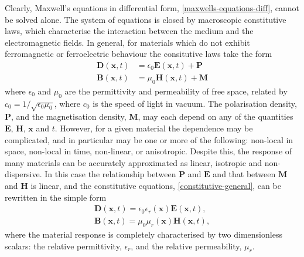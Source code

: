 Clearly, Maxwell's equations in differential form, \ref{maxwells-equations-diff}, cannot be solved alone. The system of equations is closed by macroscopic constitutive laws, which characterise the interaction between the medium and the electromagnetic fields. In general, for materials which do not exhibit ferromagnetic or ferroelectric behaviour the consitutive laws take the form
\begin{subequations}
    \label{constitutive-general}
    \begin{align}
        \mathbf{D}(\mathbf{x},t) &= \epsilon_0 \mathbf{E}(\mathbf{x},t) + \mathbf{P} \label{constitutive-general-E} \\
        \mathbf{B}(\mathbf{x},t) &= \mu_0 \mathbf{H}(\mathbf{x},t) + \mathbf{M}
    \end{align}
\end{subequations}
where $\epsilon_0$ and $\mu_0$ are the permittivity and permeability of free space, related by $c_0 = 1/ \sqrt{\epsilon_0 \mu_0}$, where $c_0$ is the speed of light in vacuum. The polarisation density, $\mathbf{P}$, and the magnetisation density, $\mathbf{M}$,
may each depend on any of the quantities $\mathbf{E}$, $\mathbf{H}$, $\mathbf{x}$ and $t$. However, for a given material the dependence may be complicated, and in particular may be one or more of the following: non-local in space, non-local in time, non-linear, or anisotropic. Despite this, the response of many materials can be accurately approximated as linear, isotropic and non-dispersive. In this case the relationship between $\mathbf{P}$ and $\mathbf{E}$ and that between $\mathbf{M}$ and $\mathbf{H}$ is linear, and the constitutive equations, \ref{constitutive-general}, can be rewritten in the simple form
%
\begin{subequations}
    \label{constitutive-linear}
    \begin{align}
        \mathbf{D}(\mathbf{x},t) = \epsilon_0 \epsilon_r(\mathbf{x}) \mathbf{E}(\mathbf{x},t), \label{constitutive-linear-D} \\
        \mathbf{B}(\mathbf{x},t) = \mu_0 \mu_r(\mathbf{x}) \mathbf{H}(\mathbf{x},t),
    \end{align}
\end{subequations}
%
where the material response is completely characterised by two dimensionless scalars: the relative permittivity, $\epsilon_r$, and the relative permeability, $\mu_r$.

